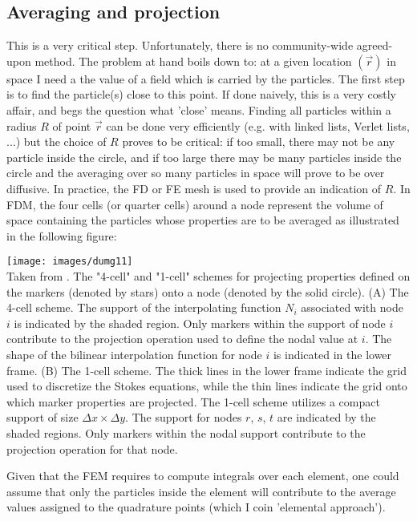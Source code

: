 \subsection{Averaging and projection} 
This is a very critical step. Unfortunately, there is no community-wide
agreed-upon method. The problem at hand boils down to: at a given location $(\vec r)$ in space I need a
the value of a field which is carried by the particles. 
The first step is to find the particle(s) close to this point. If done naively, this is a very costly affair, 
and begs the question what 'close' means. Finding all particles within a radius $R$ of point $\vec r$ can 
be done very efficiently (e.g. with linked lists, Verlet lists, ...) but the choice 
of $R$ proves to be critical:
if too small, there may not be any particle inside the circle, and if too large there may be many particles 
inside the circle and the averaging over so many particles in space will prove to be over diffusive. 
In practice, the FD or FE mesh is used to provide an indication of $R$. 
In FDM, the four cells (or quarter cells) around
a node represent the volume of space containing the particles whose properties are to be averaged \cite{dumg11} 
as illustrated in the following figure:

\begin{center}
\texttt{[image: images/dumg11]}\\
{\captionfont Taken from \cite{dumg11}. The "4-cell" and "1-cell" schemes for projecting 
properties defined on the markers (denoted by stars) onto a node (denoted by the solid circle). 
(A) The 4-cell scheme. The support of the interpolating function $N_i$ associated
with node $i$ is indicated by the shaded region. Only markers within the support of node $i$ 
contribute to the projection operation used to define the nodal value at $i$. The shape of 
the bilinear interpolation function for node $i$ is indicated in the lower frame. 
(B) The 1-cell scheme. The thick lines in the lower frame indicate the grid used to discretize the
Stokes equations, while the thin lines indicate the grid onto which marker properties are projected. 
The 1-cell scheme utilizes a compact support of size $\Delta x \times  \Delta y$. The support 
for nodes $r$, $s$, $t$ are indicated by the shaded regions. Only markers within the nodal 
support contribute to the projection operation for that node.}
\end{center}

Given that the FEM requires to compute integrals over each element, one could assume that 
only the particles inside the element will contribute 
to the average values assigned to the quadrature points (which I coin 'elemental approach'). 

